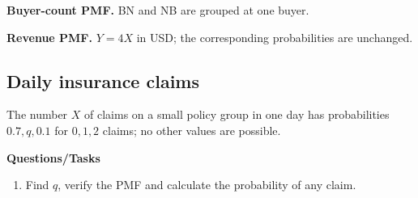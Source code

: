 \par\noindent \begin{minipage}[t]{.485\linewidth}
\centering
{}
\par\small \textbf{Buyer-count PMF.} BN and NB are grouped at one buyer.
\end{minipage}\hfill\begin{minipage}[t]{.485\linewidth}
\centering
{}
\par\small \textbf{Revenue PMF.} $Y=4X$ in USD; the corresponding probabilities are unchanged.
\end{minipage}\par\medskip

\subsection{Daily insurance claims}
The number $X$ of claims on a small policy group in one day has probabilities $0.7,q,0.1$ for $0,1,2$ claims; no other values are possible.

\textbf{Questions/Tasks}
\begin{enumerate}
\item Find $q$, verify the PMF and calculate the probability of any claim.
\end{enumerate}
